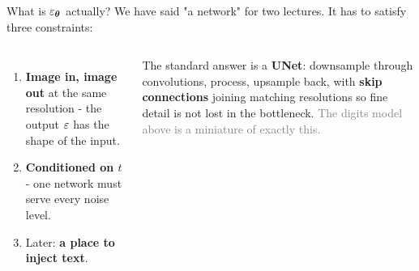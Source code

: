 \documentclass[aspectratio=169]{beamer}
\begin{document}
\begin{frame}{What is $\varepsilon_{\bm{\theta}}$ actually?}
  \small
  We have said "a network" for two lectures. It has to satisfy three constraints:
  \vskip 4pt
  \begin{columns}[T]
    \footnotesize
    \begin{enumerate}\setlength\itemsep{2pt}
      \item \textbf{Image in, image out} at the same resolution - the output $\varepsilon$ has the
        shape of the input.
      \item \textbf{Conditioned on $t$} - one network must serve every noise level.
      \item Later: \textbf{a place to inject text}.
    \end{enumerate}
    \vskip 6pt
    The standard answer is a \textbf{UNet}: downsample through convolutions, process, upsample
    back, with \textbf{skip connections} joining matching resolutions so fine detail is not
    lost in the bottleneck.
    \vskip 4pt
    \footnotesize
    \textcolor{gray}{The digits model above is a miniature of exactly this.}
  \end{columns}
\end{frame}
\end{document}
